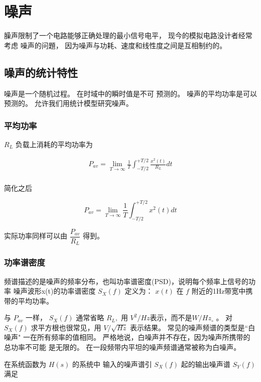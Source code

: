 \documentclass[cn,11pt,chinese,black,simple]{../elegantbook}
\begin{document}
\fi 

\chapter{噪声}


臊声限制了一个电路能够正确处理的最小信号电平， 现今的模拟电路没计者经常考虑
噪声的问題， 因为噪声与功耗、速度和线性度之间是互相制约的。

\section{噪声的统计特性}

噪声是一个随机过程。
在时域中的瞬时值是不可
预测的。
噪声的平均功率是可以
预测的。
允许我们用统计模型研究噪声。

\subsection{平均功率}

\(R_L\) 负载上消耗的平均功率为

$$\begin{array}{l}
    P_{a v}=\lim _{T \rightarrow \infty} \frac{1}{T} \int_{-T / 2}^{+T / 2} \frac{x^{2}(t)}{R_{L}} d t \\
    
\end{array}$$

简化之后

\[P_{a v}=\lim _{T \rightarrow \infty} \frac{1}{T} \int_{-T / 2}^{+T / 2} x^{2}(t) d t\]

实际功率同样可以由 \(\dfrac{P_{av}}{R_L}\) 得到。

\subsection{功率谱密度}

频谱描述的是噪声的频率分布，也叫功率谱密度(PSD)，说明每个频率上信号的功率
噪声波形x(t)的功率谱密度 \(S_{X}(f)\) 定义为：
\(x(t)\) 在 \(f\) 附近的1Hz带宽中携带的平均功率。

与 \(P_{a v}\) 一样， \(S_{X}(f)\) 通常省略 \(R_{L},\) 用 \(V^{2} / H z\)表示，而不是\(W / H z_{\circ}\) 。
对 \(S_{X}(f)\) 求平方根也很常见，用 \(V / \sqrt{H z}\) 表示结果。
常见的噪声频谱的类型是“白噪声" 一在所有频率的值相同。
严格地说，白噪声并不存在，因为噪声所携带的总功率不可能
是无限的。
在一段频带内平坦的噪声频谱通常被称为白噪声。

在系统函数为 \(H(s)\) 的系统中 输入的噪声谱引 \(S_X(f)\) 起的输出噪声谱 \(S_Y(f)\) 满足 
\end{document}
